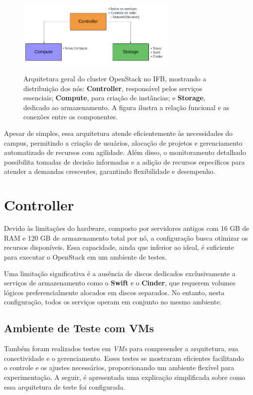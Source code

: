 \begin{figure}[htbp]
    \centering
    \caption{Arquitetura geral do cluster OpenStack no IFB, mostrando a distribuição dos nós: \textbf{Controller}, responsável pelos serviços essenciais; \textbf{Compute}, para criação de instâncias; e \textbf{Storage}, dedicado ao armazenamento. A figura ilustra a relação funcional e as conexões entre os componentes.}
    \includegraphics[width=0.7\textwidth]{images/cluster_architecture.png}
    \label{fig:cluster_architecture}
\end{figure}

Apesar de simples, essa arquitetura atende eficientemente às necessidades do campus, permitindo a criação de usuários, alocação de projetos e gerenciamento automatizado de recursos com agilidade. Além disso, o monitoramento detalhado possibilita tomadas de decisão informadas e a adição de recursos específicos para atender a demandas crescentes, garantindo flexibilidade e desempenho.

\section{Controller}

Devido às limitações do hardware, composto por servidores antigos com 16 GB de RAM e 120 GB de armazenamento total por nó, a configuração busca otimizar os recursos disponíveis. Essa capacidade, ainda que inferior ao ideal, é suficiente para executar o OpenStack em um ambiente de testes.

Uma limitação significativa é a ausência de discos dedicados exclusivamente a serviços de armazenamento como o \textbf{Swift} e o \textbf{Cinder}, que requerem volumes lógicos preferencialmente alocados em discos separados. No entanto, nesta configuração, todos os serviços operam em conjunto no mesmo ambiente.

\subsection{Ambiente de Teste com VMs}
Também foram realizados testes em \textit{VMs} para compreender a arquitetura, sua conectividade e o gerenciamento. Esses testes se mostraram eficientes facilitando o controle e os ajustes necessários, proporcionando um ambiente flexível para experimentação. A seguir, é apresentada uma explicação simplificada sobre como essa arquitetura de teste foi configurada.

